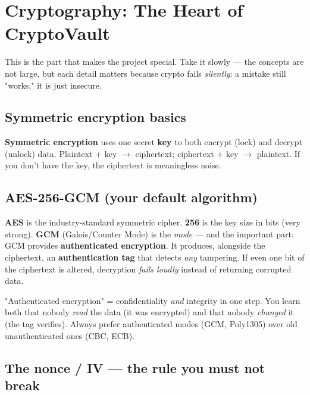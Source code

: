 \documentclass[11pt,a4paper]{article}
\begin{document}
\section{Cryptography: The Heart of CryptoVault}

This is the part that makes the project special. Take it slowly — the concepts are not large, but
each detail matters because crypto fails \emph{silently}: a mistake still "works," it is just
insecure.

\subsection{Symmetric encryption basics}

\textbf{Symmetric encryption} uses one secret \textbf{key} to both encrypt (lock) and decrypt
(unlock) data. Plaintext + key $\rightarrow$ ciphertext; ciphertext + key $\rightarrow$ plaintext.
If you don't have the key, the ciphertext is meaningless noise.

\subsection{AES-256-GCM (your default algorithm)}

\textbf{AES} is the industry-standard symmetric cipher. \textbf{256} is the key size in bits
(very strong). \textbf{GCM} (Galois/Counter Mode) is the \emph{mode} — and the important part:
GCM provides \textbf{authenticated encryption}. It produces, alongside the ciphertext, an
\textbf{authentication tag} that detects \emph{any} tampering. If even one bit of the ciphertext is
altered, decryption \emph{fails loudly} instead of returning corrupted data.

\begin{keyidea}
"Authenticated encryption" = confidentiality \emph{and} integrity in one step. You learn both that
nobody \emph{read} the data (it was encrypted) and that nobody \emph{changed} it (the tag verifies).
Always prefer authenticated modes (GCM, Poly1305) over old unauthenticated ones (CBC, ECB).
\end{keyidea}

\subsection{The nonce / IV — the rule you must not break}
\end{document}
